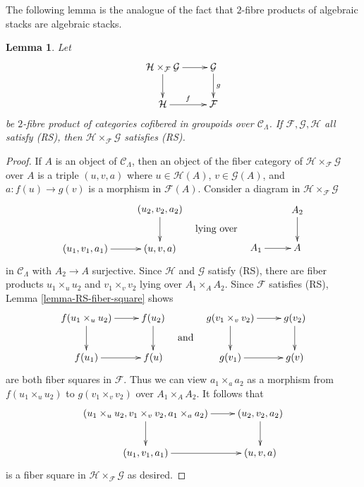 \documentclass{stacks-project}
\theoremstyle{plain}
\newtheorem{lemma}[subsection]{Lemma}
\theoremstyle{definition}
\theoremstyle{remark}
\numberwithin{equation}{subsection}
\begin{document}
\noindent
The following lemma is the analogue of the fact that $2$-fibre products
of algebraic stacks are algebraic stacks.

\begin{lemma}
\label{lemma-RS-fiber-product-morphisms}
Let
$$
\xymatrix{
\mathcal{H} \times_\mathcal{F} \mathcal{G} \ar[r] \ar[d] &
\mathcal{G} \ar[d]^g \\
\mathcal{H} \ar[r]^f & \mathcal{F}
}
$$
be $2$-fibre product of categories cofibered in groupoids over
$\mathcal{C}_\Lambda$. If $\mathcal{F}, \mathcal{G}, \mathcal{H}$
all satisfy (RS), then $\mathcal{H} \times_\mathcal{F} \mathcal{G}$
satisfies (RS).
\end{lemma}

\begin{proof}
If $A$ is an object of $\mathcal{C}_\Lambda$, then an object of the fiber
category of $\mathcal{H} \times_\mathcal{F} \mathcal{G}$ over $A$
is a triple $(u, v, a)$ where $u \in \mathcal{H}(A)$, $v \in \mathcal{G}(A)$,
and $a : f(u) \to g(v)$ is a morphism in $\mathcal{F}(A)$. Consider
a diagram in $\mathcal{H} \times_\mathcal{F} \mathcal{G}$
$$
\vcenter{
\xymatrix{
           & (u_2, v_2, a_2) \ar[d] \\
(u_1, v_1, a_1) \ar[r] & (u, v, a)
}
}
\quad\text{lying over}\quad
\vcenter{
\xymatrix{
           & A_2 \ar[d] \\
A_1 \ar[r] & A
}
}
$$
in $\mathcal{C}_\Lambda$ with $A_2 \to A$ surjective. Since
$\mathcal{H}$ and $\mathcal{G}$ satisfy (RS), there are fiber
products $u_1 \times_u u_2$ and $v_1 \times_v v_2$ lying over
$A_1 \times_A A_2$. Since $\mathcal{F}$ satisfies (RS),
Lemma \ref{lemma-RS-fiber-square} shows
$$
\vcenter{
\xymatrix{
f(u_1 \times_u u_2) \ar[r] \ar[d] & f(u_2) \ar[d] \\
f(u_1) \ar[r] & f(u)
}
}
\quad\text{and}\quad
\vcenter{
\xymatrix{
g(v_1 \times_v v_2) \ar[r] \ar[d] & g(v_2) \ar[d] \\
g(v_1) \ar[r] & g(v)
}
}
$$
are both fiber squares in $\mathcal{F}$. Thus we can view
$a_1 \times_a a_2$ as a morphism from $f(u_1 \times_u u_2)$ to
$g(v_1 \times_v v_2)$ over $A_1 \times_A A_2$.
It follows that
$$
\xymatrix{
 (u_1 \times_u u_2, v_1 \times_v v_2, a_{1} \times_a a_2) \ar[d] \ar[r] &
(u_2, v_2, a_2) \ar[d] \\
(u_1, v_1, a_1) \ar[r] & (u, v, a)
}
$$
is a fiber square in $\mathcal{H} \times_\mathcal{F} \mathcal{G}$
as desired.
\end{proof}
\end{document}

